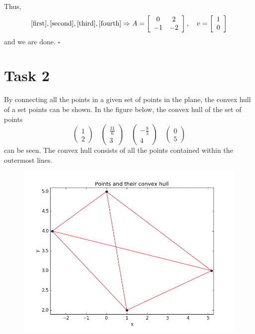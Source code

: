 \documentclass[]{article}
\begin{document}
Thus, \begin{equation*}
\eqref{first}, \eqref{second}, \eqref{third}, \eqref{fourth} \Rightarrow A=\left[\begin{array}{cc}
0&2\\
-1&-2
\end{array}\right], \quad v=\left[\begin{array}{c}
1\\
0
\end{array}\right]
\end{equation*}
and we are done. $\square$
\section*{Task 2}
By connecting all the points in a given set of points in the plane, the convex hull of a set points can be shown. In the figure below, the convex hull of the set of points \begin{equation*}
\left(\begin{array}{c}
1\\
2
\end{array}\right) \quad 
\left(\begin{array}{c}
\frac{31}{6}\\
3
\end{array}\right) \quad
\left(\begin{array}{r}
-\frac{8}{3}\\
4
\end{array}\right) \quad
\left(\begin{array}{c}
0\\
5
\end{array}\right)
\end{equation*}
can be seen. The convex hull consists of all the points contained within the outermost lines.
\begin{figure}[h!]
\includegraphics[scale=0.7]{convex_hull}
\end{figure}
\end{document}
